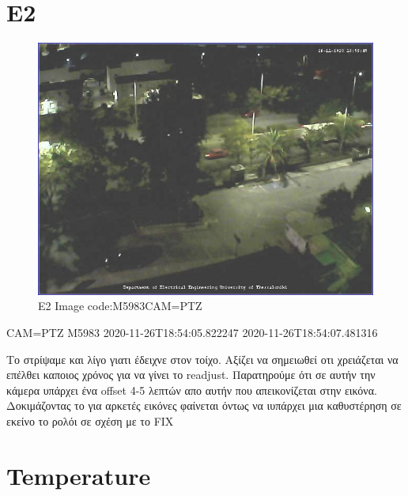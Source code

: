 \documentclass[hidelinks, 12pt, a4paper]{article}
\begin{document}
\section{E2}

\begin{figure}[h!]
\centering
	\includegraphics[height=.38\textheight, width=\textwidth]{assets/session1/image_ptz.jpg}
	\caption{E2 Image code:M5983CAM=PTZ} 
\end{figure}
CAM=PTZ
M5983 
2020-11-26T18:54:05.822247
2020-11-26T18:54:07.481316

Το στρίψαμε και λίγο γιατι έδειχνε στον τοίχο. Αξίζει να σημειωθεί οτι χρειάζεται να επέλθει καποιος χρόνος για να γίνει το readjust.
Παρατηρούμε ότι σε αυτήν την κάμερα υπάρχει ένα offset 4-5 λεπτών απο αυτήν που απεικονίζεται στην εικόνα. Δοκιμάζοντας το για αρκετές εικόνες φαίνεται όντως να ιυπάρχει μια καθυστέρηση σε εκείνο το ρολόι σε σχέση με το FIX

\section{Temperature}
\end{document}
